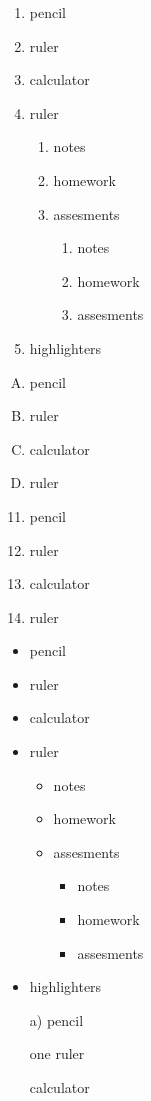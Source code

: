 \documentclass[11pt]{article}
\begin{document}
\begin{enumerate}
    \item pencil
    \item ruler
    \item calculator
    \item ruler
    \begin{enumerate}
        \item notes
        \item homework
        \item assesments
        \begin{enumerate}
            \item notes
            \item homework
            \item assesments
            \end{enumerate}
    \end{enumerate}
    \item highlighters
\end{enumerate}

\vspace{2cm}
\begin{enumerate}[A.]
    \item pencil
    \item ruler
    \item calculator
    \item ruler
\end{enumerate}

\vspace{2cm}
\begin{enumerate}\setcounter{enumi}{10}
    \item pencil
    \item ruler
    \item calculator
    \item ruler
\end{enumerate}

\pagebreak
\begin{itemize}
    \item pencil
    \item ruler
    \item calculator
    \item ruler
    \begin{itemize}
        \item notes
        \item homework
        \item assesments
        \begin{itemize}
            \item notes
            \item homework
            \item assesments
            \end{itemize}
    \end{itemize}
    \item highlighters
\end{itemize}
\begin{enumerate}
    \item[a)] pencil
    \item[one] ruler
    \item[] calculator 
\end{enumerate}
\end{document}
